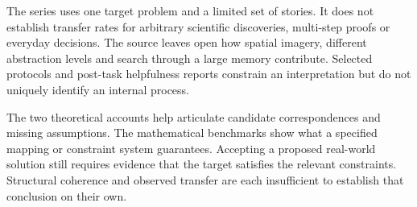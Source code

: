 The series uses one target problem and a limited
set of stories. It does not establish transfer
rates for arbitrary scientific discoveries,
multi-step proofs or everyday decisions.
The source leaves open how spatial imagery,
different abstraction levels and search through
a large memory contribute. Selected protocols
and post-task helpfulness reports constrain an
interpretation but do not uniquely identify
an internal process.

The two theoretical accounts help articulate
candidate correspondences and missing assumptions.
The mathematical benchmarks show what a specified
mapping or constraint system guarantees.
Accepting a proposed real-world solution still
requires evidence that the target satisfies
the relevant constraints. Structural coherence
and observed transfer are each insufficient
to establish that conclusion on their own.
